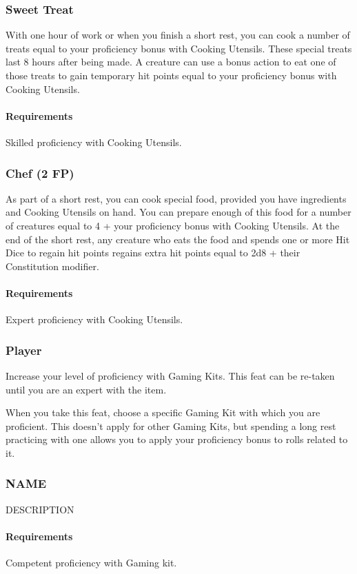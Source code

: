\subsubsection{Sweet Treat} \label{feat::sweettreat}
    With one hour of work or when you finish a short rest, you can cook a number of treats equal to your proficiency bonus with Cooking Utensils.
    These special treats last 8 hours after being made.
    A creature can use a bonus action to eat one of those treats to gain temporary hit points equal to your proficiency bonus with Cooking Utensils.
    \paragraph{Requirements} Skilled proficiency with Cooking Utensils.
\subsubsection{Chef (2 FP)} \label{feat::chef}
    As part of a short rest, you can cook special food, provided you have ingredients and Cooking Utensils on hand.
    You can prepare enough of this food for a number of creatures equal to 4 + your proficiency bonus with Cooking Utensils.
    At the end of the short rest, any creature who eats the food and spends one or more Hit Dice to regain hit points regains extra hit points equal to 2d8 + their Constitution modifier.
    \paragraph{Requirements} Expert proficiency with Cooking Utensils.
\subsubsection{Player} \label{feat::player}
    Increase your level of proficiency with Gaming Kits.
    This feat can be re-taken until you are an expert with the item.

    When you take this feat, choose a specific Gaming Kit with which you are proficient.
    This doesn't apply for other Gaming Kits, but spending a long rest practicing with one allows you to apply your proficiency bonus to rolls related to it.
\subsubsection{NAME} \label{feat::name}
    DESCRIPTION
    \paragraph{Requirements} Competent proficiency with Gaming kit.

